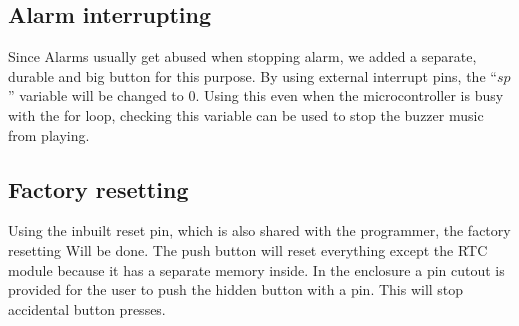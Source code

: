 \begin{minipage}{0.97\textwidth}
\centering
{}\hfill
\centering{}\hfill
{}
\end{minipage}
\newpage
\subsection{Alarm interrupting}
Since Alarms usually get abused when stopping alarm, we added a separate, durable and big button for this purpose. By using external interrupt pins, the “$sp$” variable will be changed to 0. Using this even when the microcontroller is busy with the for loop, checking this variable can be used to stop the buzzer music from playing.
\subsection{Factory resetting}
Using the inbuilt reset pin, which is also shared with the programmer, the factory resetting
Will be done. The push button will reset everything except the RTC module because it has a separate memory inside. In the enclosure a pin cutout is provided for the user to push the hidden button with a pin. This will stop accidental button presses.

